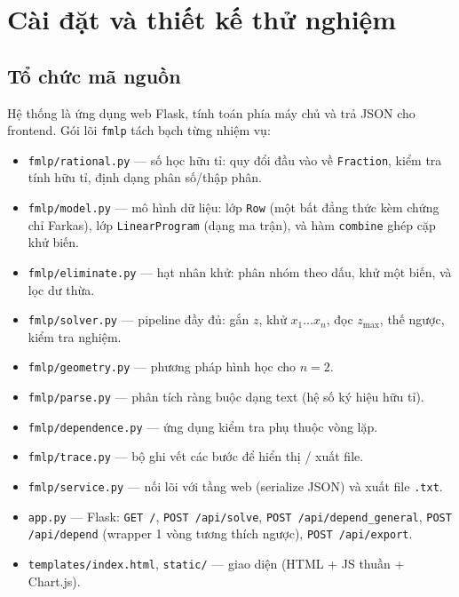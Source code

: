 \documentclass[12pt,a4paper]{article}
\theoremstyle{definition}
\begin{document}
\section{Cài đặt và thiết kế thử nghiệm}

\subsection{Tổ chức mã nguồn}

Hệ thống là ứng dụng web Flask, tính toán phía máy chủ và trả JSON cho
frontend. Gói lõi \texttt{fmlp} tách bạch từng nhiệm vụ:

\begin{itemize}
    \item \texttt{fmlp/rational.py} --- số học hữu tỉ: quy đổi đầu vào về
          \texttt{Fraction}, kiểm tra tính hữu tỉ, định dạng phân số/thập phân.
    \item \texttt{fmlp/model.py} --- mô hình dữ liệu: lớp \texttt{Row} (một bất
          đẳng thức kèm chứng chỉ Farkas), lớp \texttt{LinearProgram} (dạng ma
          trận), và hàm \texttt{combine} ghép cặp khử biến.
    \item \texttt{fmlp/eliminate.py} --- hạt nhân khử: phân nhóm theo dấu, khử
          một biến, và lọc dư thừa.
    \item \texttt{fmlp/solver.py} --- pipeline đầy đủ: gắn $z$, khử
          $x_1\ldots x_n$, đọc $z_{\max}$, thế ngược, kiểm tra nghiệm.
    \item \texttt{fmlp/geometry.py} --- phương pháp hình học cho $n = 2$.
    \item \texttt{fmlp/parse.py} --- phân tích ràng buộc dạng text (hệ số ký
          hiệu hữu tỉ).
    \item \texttt{fmlp/dependence.py} --- ứng dụng kiểm tra phụ thuộc vòng lặp.
    \item \texttt{fmlp/trace.py} --- bộ ghi vết các bước để hiển thị / xuất file.
    \item \texttt{fmlp/service.py} --- nối lõi với tầng web (serialize JSON) và
          xuất file \texttt{.txt}.
    \item \texttt{app.py} --- Flask: \texttt{GET /}, \texttt{POST /api/solve},
          \texttt{POST /api/depend\_general}, \texttt{POST /api/depend} (wrapper
          1 vòng tương thích ngược), \texttt{POST /api/export}.
    \item \texttt{templates/index.html}, \texttt{static/} --- giao diện (HTML +
          JS thuần + Chart.js).
\end{itemize}
\end{document}
